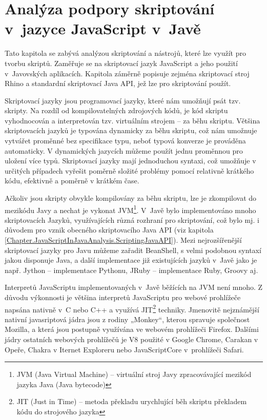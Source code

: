 \chapter{Analýza podpory skriptování v~jazyce JavaScript v~Javě}
\label{Chapter.JavaScriptInJavaAnalysis}

Tato kapitola se zabývá analýzou skriptování a nástrojů, které lze využít pro tvorbu skriptů. Zaměřuje se na skriptovací jazyk JavaScript a jeho použití v~Javovských aplikacích. Kapitola záměrně popisuje zejména skriptovací stroj Rhino a standardní skriptovací Java API, jež lze pro skriptování použít.

Skriptovací jazyky jsou programovací jazyky, které nám umožňují psát tzv. skripty. Na rozdíl od kompilovatelných zdrojových kódů, je kód skriptu vyhodnocován a interpretován tzv. virtuálním strojem -- za běhu skriptu. Většina skriptovacích jazyků je typována dynamicky za běhu skriptu, což nám umožnuje vytvářet proměnné bez specifikace typu, neboť typová konverze je prováděna automaticky. V dynamických jazycích můžeme použít jednu proměnnou pro uložení více typů. Skriptovací jazyky mají jednoduchou syntaxi, což umožňuje v určitých případech vyřešit poměrně složité problémy pomocí relativně krátkého kódu, efektivně a poměrně v krátkém čase.

Ačkoliv jsou skripty obvykle kompilovány za běhu skriptu, lze je zkompilovat do mezikódu Javy a nechat je vykonat JVM\footnote{JVM  (Java Virtual Machine) -- virtuální stroj Javy zpracovávající mezikód jazyka Java (Java bytecode)}. V~Javě bylo implementováno mnoho skriptovacích Jazyků, využívajících různá rozhraní pro skriptování, což bylo mj. i důvodem pro vznik obecného skriptovacího Java API (viz kapitola \ref{Chapter.JavaScriptInJavaAnalysis.ScriptingJavaAPI}). Mezi nejrozšířenější skriptovací jazyky pro Javu můžeme zařadit BeanShell, s velmi podobnou syntaxí jakou disponuje Java, a další implementace již existujících jazyků v~Javě jako je např. Jython -- implementace Pythonu,  JRuby -- implementace Ruby, Groovy aj.

Interpretů JavaScriptu implementovaných v~Javě běžících na JVM není mnoho. Z důvodu výkonnosti je většina interpretů JavaScriptu pro webové prohlížeče napsána nativně v~C nebo C++ a využívá JIT\footnote{JIT (Just in Time) -- metoda překladu urychlující běh skriptu překladem kódu do strojového jazyka} techniky. Jmenovitě nejznámější nativní javasriptová jádra jsou z rodiny „Monkey“, kterou spravuje společnost Mozilla, a která jsou postupně využívána ve webovém prohlížeči Firefox. Dalšími jádry ostatních webových prohlížečů je V8 použité v Google Chrome, Carakan v Opeře, Chakra v Iternet Exploreru nebo JavaScriptCore v~prohlížeči Safari.

